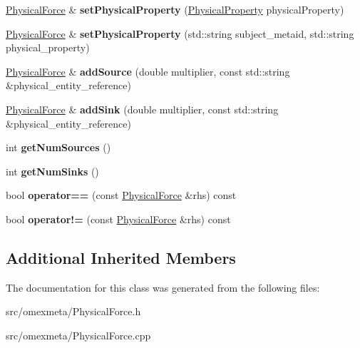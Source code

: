 \begin{DoxyCompactItemize}
\mbox{\label{classomexmeta_1_1PhysicalForce_a081aecc43d16b2fc8826c4050eb2055d}} 
\hyperlink{classomexmeta_1_1PhysicalForce}{Physical\+Force} \& {\bfseries set\+Physical\+Property} (\hyperlink{classomexmeta_1_1PhysicalProperty}{Physical\+Property} physical\+Property)
\item 
\mbox{\label{classomexmeta_1_1PhysicalForce_a3f979432322d40efc8a15cf5ee883100}} 
\hyperlink{classomexmeta_1_1PhysicalForce}{Physical\+Force} \& {\bfseries set\+Physical\+Property} (std\+::string subject\+\_\+metaid, std\+::string physical\+\_\+property)
\item 
\mbox{\label{classomexmeta_1_1PhysicalForce_adfb620f6e28476dce6aa5b0d7d5b9546}} 
\hyperlink{classomexmeta_1_1PhysicalForce}{Physical\+Force} \& {\bfseries add\+Source} (double multiplier, const std\+::string \&physical\+\_\+entity\+\_\+reference)
\item 
\mbox{\label{classomexmeta_1_1PhysicalForce_a7dca33926e787589d5a58de50fc1be1d}} 
\hyperlink{classomexmeta_1_1PhysicalForce}{Physical\+Force} \& {\bfseries add\+Sink} (double multiplier, const std\+::string \&physical\+\_\+entity\+\_\+reference)
\item 
\mbox{\label{classomexmeta_1_1PhysicalForce_a9910c8edac57daf70faa1f1e2e0208d1}} 
int {\bfseries get\+Num\+Sources} ()
\item 
\mbox{\label{classomexmeta_1_1PhysicalForce_a1135c75705b59afa7037bab313009534}} 
int {\bfseries get\+Num\+Sinks} ()
\item 
\mbox{\label{classomexmeta_1_1PhysicalForce_affa0a1f3cdce0a3336d56658a92c65f3}} 
bool {\bfseries operator==} (const \hyperlink{classomexmeta_1_1PhysicalForce}{Physical\+Force} \&rhs) const
\item 
\mbox{\label{classomexmeta_1_1PhysicalForce_aeb7adb235c0caac04c7aa599f98f258a}} 
bool {\bfseries operator!=} (const \hyperlink{classomexmeta_1_1PhysicalForce}{Physical\+Force} \&rhs) const
\end{DoxyCompactItemize}
\subsection*{Additional Inherited Members}


The documentation for this class was generated from the following files\+:\begin{DoxyCompactItemize}
\item 
src/omexmeta/Physical\+Force.\+h\item 
src/omexmeta/Physical\+Force.\+cpp\end{DoxyCompactItemize}
